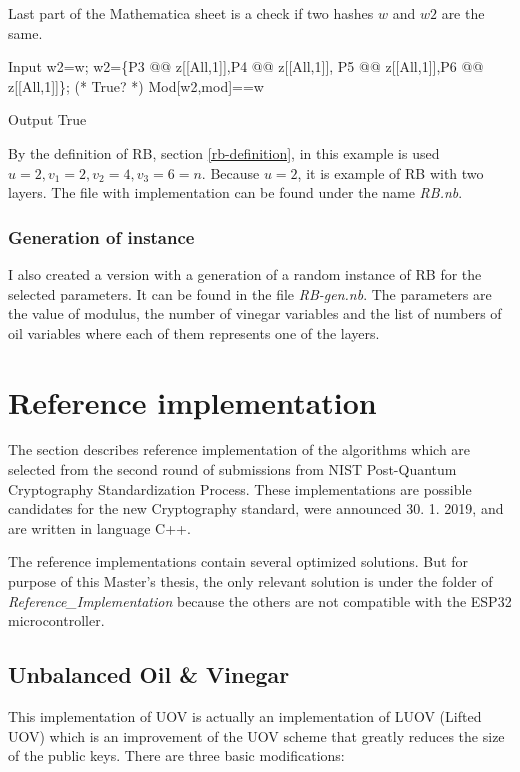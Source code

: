 \documentclass[thesis=M,english]{FITthesis}[2019/12/23]
\begin{document}
\bigskip
\noindent
Last part of the Mathematica sheet is a check if two hashes $w$ and $w2$ are the same.
\begin{mmaCell}[moredefined={w2, w, P5, P6, z, P4, P3, mod}]{Input}
w2=w;
w2=\{P3 @@ z[[All,1]],P4 @@ z[[All,1]],
P5 @@ z[[All,1]],P6 @@ z[[All,1]]\};
(* True? *)
Mod[w2,mod]==w
\end{mmaCell}
\begin{mmaCell}[addtoindex=2]{Output}
True
\end{mmaCell}
By the definition of RB, section \ref{rb-definition}, in this example is used $u=2, v_1=2, v_2=4, v_3=6=n$. Because $u=2$, it is example of RB with two layers.
The file with implementation can be found under the name \textit{RB.nb}.

\subsubsection{Generation of instance}
I also created a version with a generation of a random instance of RB for the selected parameters. It can be found in the file \textit{RB-gen.nb}. The parameters are the value of modulus, the number of vinegar variables and the list of numbers of oil variables where each of them represents one of the layers.

\newpage
\lstset{basicstyle=\footnotesize\ttfamily}
\section{Reference implementation}
The section describes reference implementation of the algorithms which are selected from the second round of submissions from NIST Post-Quantum Cryptography Standardization Process.\cite{L-NIST-2ND} These implementations are possible candidates for the new Cryptography standard, were announced 30. 1. 2019, and are written in language C++.

\bigskip
\noindent
The reference implementations contain several optimized solutions. But for purpose of this Master's thesis, the only relevant solution is under the folder of \textit{Reference\_Implementation} because the others are not compatible with the ESP32 microcontroller.

\subsection{Unbalanced Oil \& Vinegar}
This implementation of UOV is actually an implementation of LUOV (Lifted UOV) which is an improvement of the UOV scheme that greatly reduces the size of the public keys. There are three basic modifications:
\end{document}
